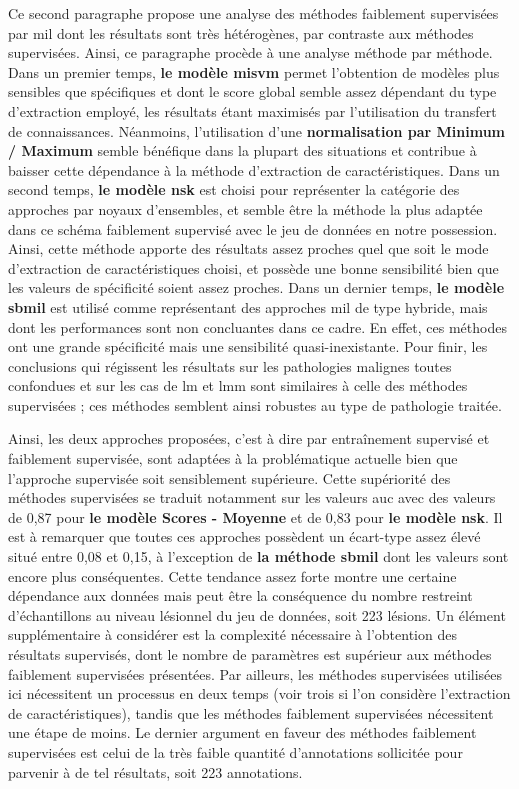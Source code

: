 Ce second paragraphe propose une analyse des méthodes faiblement supervisées par \gls{mil} dont les résultats sont très hétérogènes, par contraste aux méthodes supervisées. Ainsi, ce paragraphe procède à une analyse méthode par méthode. Dans un premier temps, \textbf{le modèle \gls{misvm}} permet l'obtention de modèles plus sensibles que spécifiques et dont le score global semble assez dépendant du type d'extraction employé, les résultats étant maximisés par l'utilisation du transfert de connaissances. Néanmoins, l'utilisation d'une \textbf{normalisation par Minimum / Maximum} semble bénéfique dans la plupart des situations et contribue à baisser cette dépendance à la méthode d'extraction de caractéristiques. Dans un second temps, \textbf{le modèle \gls{nsk}} est choisi pour représenter la catégorie des approches par noyaux d'ensembles, et semble être la méthode la plus adaptée dans ce schéma faiblement supervisé avec le jeu de données en notre possession. Ainsi, cette méthode apporte des résultats assez proches quel que soit le mode d'extraction de caractéristiques choisi, et possède une bonne sensibilité bien que les valeurs de spécificité soient assez proches. Dans un dernier temps, \textbf{le modèle \gls{sbmil}} est utilisé comme représentant des approches \gls{mil} de type hybride, mais dont les performances sont non concluantes dans ce cadre. En effet, ces méthodes ont une grande spécificité mais une sensibilité quasi-inexistante. Pour finir, les conclusions qui régissent les résultats sur les pathologies malignes toutes confondues et sur les cas de \gls{lm} et \gls{lmm} sont similaires à celle des méthodes supervisées ; ces méthodes semblent ainsi robustes au type de pathologie traitée.\par

Ainsi, les deux approches proposées, c'est à dire par entraînement supervisé et faiblement supervisée, sont adaptées à la problématique actuelle bien que l'approche supervisée soit sensiblement supérieure. Cette supériorité des méthodes supervisées se traduit notamment sur les valeurs \gls{auc} avec des valeurs de 0,87 pour \textbf{le modèle Scores - Moyenne} et de 0,83 pour \textbf{le modèle \gls{nsk}}. Il est à remarquer que toutes ces approches possèdent un écart-type assez élevé situé entre 0,08 et 0,15, à l'exception de \textbf{la méthode \gls{sbmil}} dont les valeurs sont encore plus conséquentes. Cette tendance assez forte montre une certaine dépendance aux données mais peut être la conséquence du nombre restreint d'échantillons au niveau lésionnel du jeu de données, soit 223 lésions. Un élément supplémentaire à considérer est la complexité nécessaire à l'obtention des résultats supervisés, dont le nombre de paramètres est supérieur aux méthodes faiblement supervisées présentées. Par ailleurs, les méthodes supervisées utilisées ici nécessitent un processus en deux temps (voir trois si l'on considère l'extraction de caractéristiques), tandis que les méthodes faiblement supervisées nécessitent une étape de moins. Le dernier argument en faveur des méthodes faiblement supervisées est celui de la très faible quantité d'annotations sollicitée pour parvenir à de tel résultats, soit 223 annotations.\par

